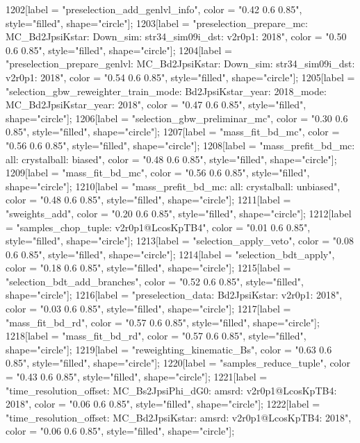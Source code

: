 {	1202[label = "preselection_add_genlvl_info", color = "0.42 0.6 0.85", style="filled", shape="circle"];
	1203[label = "preselection_prepare_mc\nmode: MC_Bd2JpsiKstar\npolarity: Down\nstrip_sim: str34_sim09i_dst\nversion: v2r0p1\nyear: 2018", color = "0.50 0.6 0.85", style="filled", shape="circle"];
	1204[label = "preselection_prepare_genlvl\nmode: MC_Bd2JpsiKstar\npolarity: Down\nstrip_sim: str34_sim09i_dst\nversion: v2r0p1\nyear: 2018", color = "0.54 0.6 0.85", style="filled", shape="circle"];
	1205[label = "selection_gbw_reweighter_train\ndata_mode: Bd2JpsiKstar\ndata_year: 2018\nmc_mode: MC_Bd2JpsiKstar\nmc_year: 2018", color = "0.47 0.6 0.85", style="filled", shape="circle"];
	1206[label = "selection_gbw_preliminar_mc", color = "0.30 0.6 0.85", style="filled", shape="circle"];
	1207[label = "mass_fit_bd_mc", color = "0.56 0.6 0.85", style="filled", shape="circle"];
	1208[label = "mass_prefit_bd_mc\nmassbin: all\nmassmodel: crystalball\ntrigger: biased", color = "0.48 0.6 0.85", style="filled", shape="circle"];
	1209[label = "mass_fit_bd_mc", color = "0.56 0.6 0.85", style="filled", shape="circle"];
	1210[label = "mass_prefit_bd_mc\nmassbin: all\nmassmodel: crystalball\ntrigger: unbiased", color = "0.48 0.6 0.85", style="filled", shape="circle"];
	1211[label = "sweights_add", color = "0.20 0.6 0.85", style="filled", shape="circle"];
	1212[label = "samples_chop_tuple\nversion: v2r0p1@LcosKpTB4", color = "0.01 0.6 0.85", style="filled", shape="circle"];
	1213[label = "selection_apply_veto", color = "0.08 0.6 0.85", style="filled", shape="circle"];
	1214[label = "selection_bdt_apply", color = "0.18 0.6 0.85", style="filled", shape="circle"];
	1215[label = "selection_bdt_add_branches", color = "0.52 0.6 0.85", style="filled", shape="circle"];
	1216[label = "preselection_data\nmode: Bd2JpsiKstar\nversion: v2r0p1\nyear: 2018", color = "0.03 0.6 0.85", style="filled", shape="circle"];
	1217[label = "mass_fit_bd_rd", color = "0.57 0.6 0.85", style="filled", shape="circle"];
	1218[label = "mass_fit_bd_rd", color = "0.57 0.6 0.85", style="filled", shape="circle"];
	1219[label = "reweighting_kinematic_Bs", color = "0.63 0.6 0.85", style="filled", shape="circle"];
	1220[label = "samples_reduce_tuple", color = "0.43 0.6 0.85", style="filled", shape="circle"];
	1221[label = "time_resolution_offset\nmode: MC_Bs2JpsiPhi_dG0\ntimeres: amsrd\nversion: v2r0p1@LcosKpTB4\nyear: 2018", color = "0.06 0.6 0.85", style="filled", shape="circle"];
	1222[label = "time_resolution_offset\nmode: MC_Bd2JpsiKstar\ntimeres: amsrd\nversion: v2r0p1@LcosKpTB4\nyear: 2018", color = "0.06 0.6 0.85", style="filled", shape="circle"];
}
